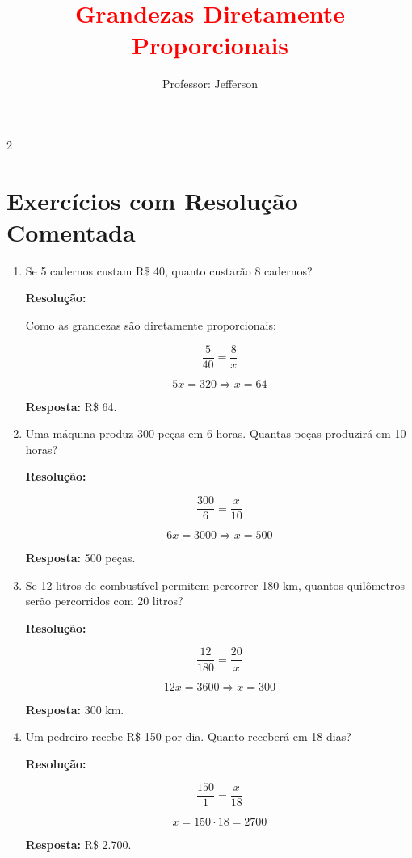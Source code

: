 \documentclass[11pt]{article}
\title{\textcolor{red}{Grandezas Diretamente Proporcionais}}
\author{Professor: Jefferson}
\date{}
\begin{document}
\maketitle
\vspace{-1cm}

\begin{multicols}{2}

\section*{Exercícios com Resolução Comentada}

\begin{enumerate}[leftmargin=*]

\item Se 5 cadernos custam R\$ 40, quanto custarão 8 cadernos?

\textbf{Resolução:}

Como as grandezas são diretamente proporcionais:

\[
\frac{5}{40} = \frac{8}{x}
\]

\[
5x = 320
\Rightarrow x = 64
\]

\textbf{Resposta:} R\$ 64.

\item Uma máquina produz 300 peças em 6 horas. Quantas peças produzirá em 10 horas?

\textbf{Resolução:}

\[
\frac{300}{6} = \frac{x}{10}
\]

\[
6x = 3000
\Rightarrow x = 500
\]

\textbf{Resposta:} 500 peças.

\item Se 12 litros de combustível permitem percorrer 180 km, quantos quilômetros serão percorridos com 20 litros?

\textbf{Resolução:}

\[
\frac{12}{180} = \frac{20}{x}
\]

\[
12x = 3600
\Rightarrow x = 300
\]

\textbf{Resposta:} 300 km.

\item Um pedreiro recebe R\$ 150 por dia. Quanto receberá em 18 dias?

\textbf{Resolução:}

\[
\frac{150}{1} = \frac{x}{18}
\]

\[
x = 150 \cdot 18 = 2700
\]

\textbf{Resposta:} R\$ 2.700.


\end{enumerate}
\end{multicols}
\end{document}
